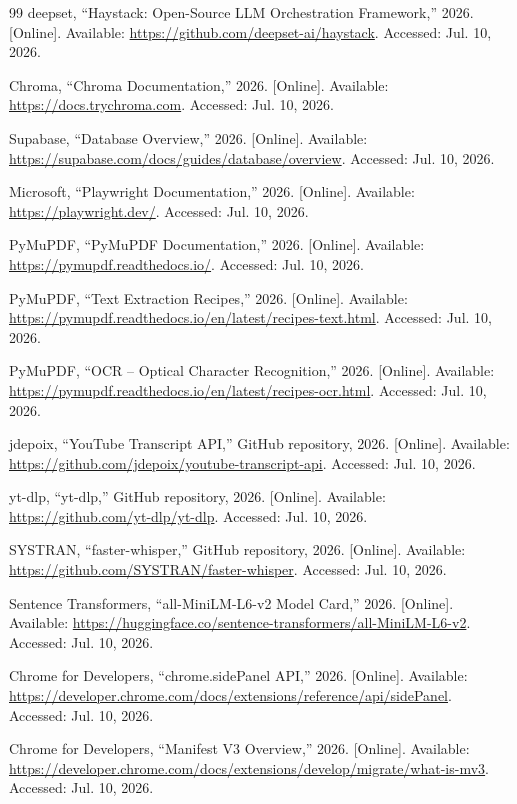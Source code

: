 \documentclass[conference]{IEEEtran}
\begin{document}
\begin{thebibliography}{99}
 deepset, ``Haystack: Open-Source LLM Orchestration Framework,'' 2026. [Online]. Available: \url{https://github.com/deepset-ai/haystack}. Accessed: Jul. 10, 2026.

 Chroma, ``Chroma Documentation,'' 2026. [Online]. Available: \url{https://docs.trychroma.com}. Accessed: Jul. 10, 2026.

 Supabase, ``Database Overview,'' 2026. [Online]. Available: \url{https://supabase.com/docs/guides/database/overview}. Accessed: Jul. 10, 2026.

 Microsoft, ``Playwright Documentation,'' 2026. [Online]. Available: \url{https://playwright.dev/}. Accessed: Jul. 10, 2026.

 PyMuPDF, ``PyMuPDF Documentation,'' 2026. [Online]. Available: \url{https://pymupdf.readthedocs.io/}. Accessed: Jul. 10, 2026.

 PyMuPDF, ``Text Extraction Recipes,'' 2026. [Online]. Available: \url{https://pymupdf.readthedocs.io/en/latest/recipes-text.html}. Accessed: Jul. 10, 2026.

 PyMuPDF, ``OCR -- Optical Character Recognition,'' 2026. [Online]. Available: \url{https://pymupdf.readthedocs.io/en/latest/recipes-ocr.html}. Accessed: Jul. 10, 2026.

 jdepoix, ``YouTube Transcript API,'' GitHub repository, 2026. [Online]. Available: \url{https://github.com/jdepoix/youtube-transcript-api}. Accessed: Jul. 10, 2026.

 yt-dlp, ``yt-dlp,'' GitHub repository, 2026. [Online]. Available: \url{https://github.com/yt-dlp/yt-dlp}. Accessed: Jul. 10, 2026.

 SYSTRAN, ``faster-whisper,'' GitHub repository, 2026. [Online]. Available: \url{https://github.com/SYSTRAN/faster-whisper}. Accessed: Jul. 10, 2026.

 Sentence Transformers, ``all-MiniLM-L6-v2 Model Card,'' 2026. [Online]. Available: \url{https://huggingface.co/sentence-transformers/all-MiniLM-L6-v2}. Accessed: Jul. 10, 2026.

 Chrome for Developers, ``chrome.sidePanel API,'' 2026. [Online]. Available: \url{https://developer.chrome.com/docs/extensions/reference/api/sidePanel}. Accessed: Jul. 10, 2026.

 Chrome for Developers, ``Manifest V3 Overview,'' 2026. [Online]. Available: \url{https://developer.chrome.com/docs/extensions/develop/migrate/what-is-mv3}. Accessed: Jul. 10, 2026.

\end{thebibliography}
\end{document}
